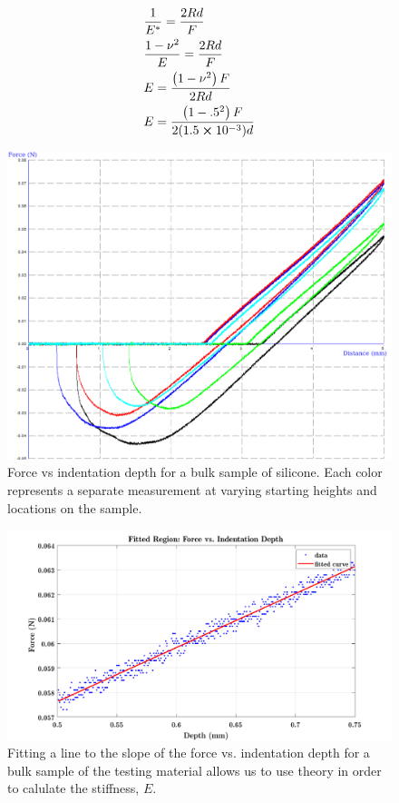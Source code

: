 \begin{align}
&\frac{1}{E^*} = \frac{2Rd}{F} \\
&\frac{1 -\nu^2}{E} = \frac{2Rd}{F} \\
&E = \frac{\left( 1-\nu^2 \right) F}{2Rd} \\
&E = \frac{\left( 1-.5^2 \right) F}{2(1.5 \cross 10^{-3})d}
\end{align}

\begin{figure}[h!]
	\centering
	\includegraphics[width=.8\linewidth]{Chapters/Figures/190406_DC_1-1RT1-5.png}
	\caption[Bulk Modulus Test]{Force vs indentation depth for a bulk sample of silicone. Each color represents a separate measurement at varying starting heights and locations on the sample.}
	\label{fig:Bulkstiffness_raw}
\end{figure}

\begin{figure}
	\centering
	\includegraphics[width=.9\linewidth]{Chapters/Figures/fittedRegionexample}
	\caption[Bulk stiffness Fit]{Fitting a line to the slope of the force vs. indentation depth for a bulk sample of the testing material allows us to use theory in order to calulate the stiffness, $E$.}
	\label{fig:fittedregionexample}
\end{figure}



